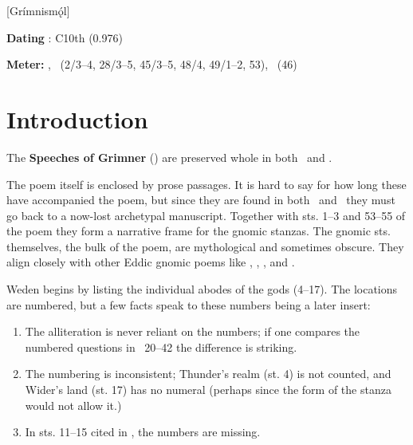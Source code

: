 [Grímnismǫ́l]

\begin{flushright}%
\textbf{Dating} \parencite{Sapp2022}: C10th (0.976)

\textbf{Meter:} \Ljodahattr, \Fornyrdislag\ (2/3–4, 28/3–5, 45/3–5, 48/4, 49/1–2, 53), \Galdralag\ (46)%
\end{flushright}

\section{Introduction}

The \textbf{Speeches of Grimner} (\Grimnismal) are preserved whole in both \Regius\ and \AM.

The poem itself is enclosed by prose passages.  It is hard to say for how long these have accompanied the poem, but since they are found in both \Regius\ and \AM\ they must go back to a now-lost archetypal manuscript.  Together with sts. 1–3 and 53–55 of the poem they form a narrative frame for the gnomic stanzas.  The gnomic sts. themselves, the bulk of the poem, are mythological and sometimes obscure.  They align closely with other Eddic gnomic poems like \Havamal, \Vafthrudnismal, \Sigrdrifumal, and \Allvismal.

Weden begins by listing the individual abodes of the gods (4–17).  The locations are numbered, but a few facts speak to these numbers being a later insert:

\begin{enumerate}
  \item The alliteration is never reliant on the numbers; if one compares the numbered questions in \Vafthrudnismal\ 20–42 the difference is striking.
  \item The numbering is inconsistent; Thunder’s realm (st. 4) is not counted, and Wider’s land (st. 17) has no numeral (perhaps since the form of the stanza would not allow it.)
  \item In sts. 11–15 cited in \Gylfaginning, the numbers are missing.
\end{enumerate}


